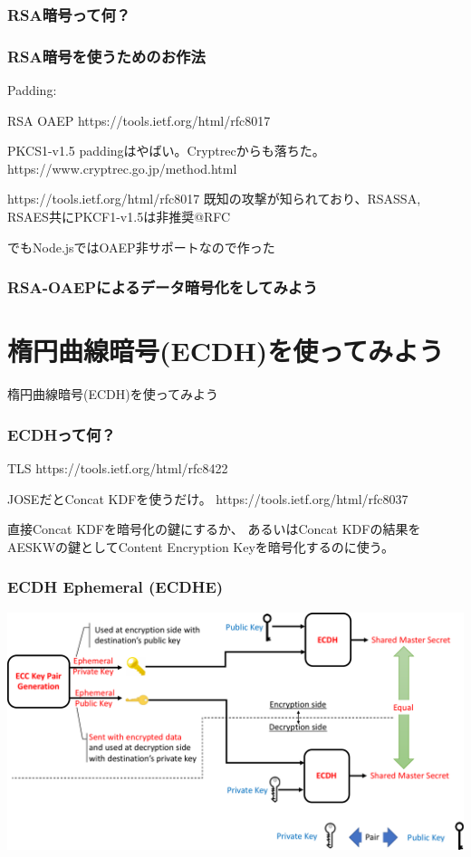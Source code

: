\documentclass[12pt,dvipdfmx]{beamer}
\begin{document}
\begin{frametitle}
\frametitle{RSA暗号って何？}
\end{frametitle}

\begin{frame}
\frametitle{RSA暗号を使うためのお作法}
Padding:

RSA OAEP
https://tools.ietf.org/html/rfc8017

PKCS1-v1.5 paddingはやばい。Cryptrecからも落ちた。
https://www.cryptrec.go.jp/method.html

https://tools.ietf.org/html/rfc8017
既知の攻撃が知られており、RSASSA, RSAES共にPKCF1-v1.5は非推奨@RFC

でもNode.jsではOAEP非サポートなので作った
\end{frame}

\begin{frame}
\frametitle{RSA-OAEPによるデータ暗号化をしてみよう}
\end{frame}


\section{楕円曲線暗号(ECDH)を使ってみよう}
\begin{frame}
\centering
{\Large 楕円曲線暗号(ECDH)を使ってみよう}
\end{frame}

\begin{frame}
\frametitle{ECDHって何？}
TLS https://tools.ietf.org/html/rfc8422

JOSEだとConcat KDFを使うだけ。
https://tools.ietf.org/html/rfc8037

直接Concat KDFを暗号化の鍵にするか、
あるいはConcat KDFの結果をAESKWの鍵としてContent Encryption Keyを暗号化するのに使う。

\end{frame}

\begin{frame}
\frametitle{ECDH Ephemeral (ECDHE)}
\begin{center}
\includegraphics[width=\linewidth]{Figs/ecdh01.pdf}
\end{center}
\end{frame}
\end{document}
